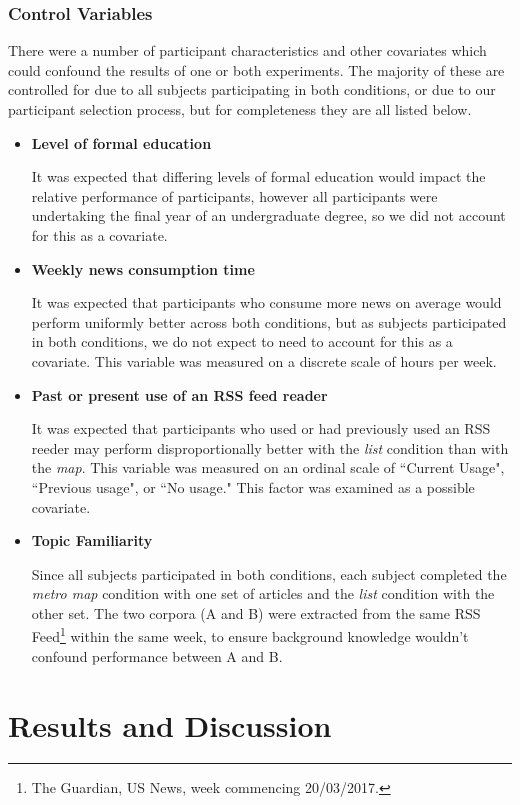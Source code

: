 \subsubsection{Control Variables}
There were a number of participant characteristics and other covariates which could confound the results of one or both experiments. The majority of these are controlled for due to all subjects participating in both conditions, or due to our participant selection process, but for completeness they are all listed below.

\begin{itemize}
	\item\textbf{Level of formal education} \par
		It was expected that differing levels of formal education would impact the relative performance of participants, however all participants were undertaking the final year of an undergraduate degree, so we did not account for this as a covariate.
	\item\textbf{Weekly news consumption time} \par
		It was expected that participants who consume more news on average would perform uniformly better across both conditions, but as subjects participated in both conditions, we do not expect to need to account for this as a covariate. This variable was measured on a discrete scale of hours per week.
	\item\textbf{Past or present use of an RSS feed reader} \par
		It was expected that participants who used or had previously used an RSS reeder may perform disproportionally better with the \textit{list} condition than with the \textit{map}. This variable was measured on an ordinal scale of ``Current Usage", ``Previous usage", or ``No usage." This factor was examined as a possible covariate.
	\item\textbf{Topic Familiarity} \par
		Since all subjects participated in both conditions, each subject completed the \textit{metro map} condition with one set of articles and the \textit{list} condition with the other set. The two corpora (A and B) were extracted from the same RSS Feed\footnote{The Guardian, US News, week commencing 20/03/2017.} within the same week, to ensure background knowledge wouldn't confound performance between A and B.
\end{itemize}

\section{Results and Discussion}


